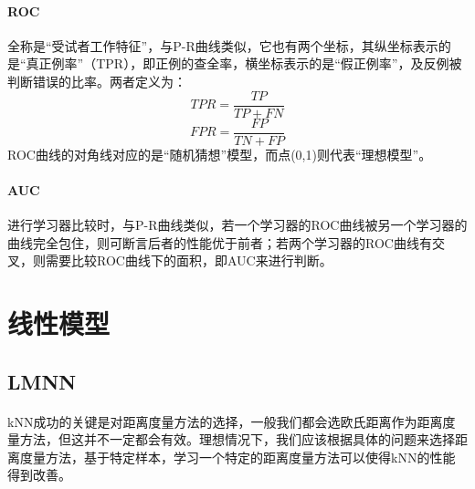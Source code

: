 \documentclass[10pt,letterpaper]{article}
\begin{document}
\paragraph{ROC} 全称是“受试者工作特征”，与P-R曲线类似，它也有两个坐标，其纵坐标表示的是“真正例率”（TPR），即正例的查全率，横坐标表示的是“假正例率”，及反例被判断错误的比率。两者定义为：\\
\begin{equation}
	TPR = \frac{TP}{TP + FN}
\end{equation}
\begin{equation}
	FPR = \frac{FP}{TN + FP}
\end{equation}
ROC曲线的对角线对应的是“随机猜想”模型，而点(0,1)则代表“理想模型”。

\paragraph{AUC} 进行学习器比较时，与P-R曲线类似，若一个学习器的ROC曲线被另一个学习器的曲线完全包住，则可断言后者的性能优于前者；若两个学习器的ROC曲线有交叉，则需要比较ROC曲线下的面积，即AUC来进行判断。
\newpage
\section{线性模型}
\subsection{LMNN}
\paragraph{} kNN成功的关键是对距离度量方法的选择，一般我们都会选欧氏距离作为距离度量方法，但这并不一定都会有效。理想情况下，我们应该根据具体的问题来选择距离度量方法，基于特定样本，学习一个特定的距离度量方法可以使得kNN的性能得到改善。
\end{document}

